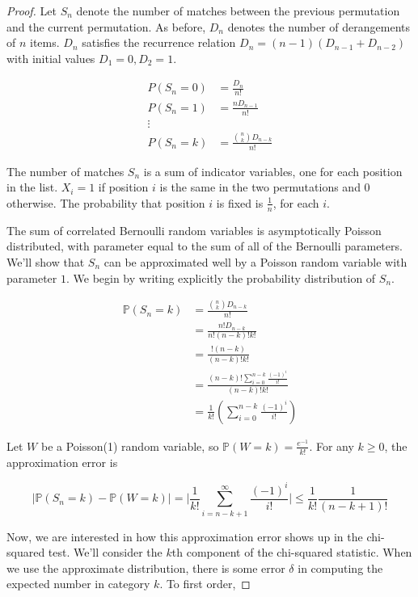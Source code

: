 \documentclass[12pt]{article}
\begin{document}
\begin{proof}


Let $S_n$ denote the number of matches between the previous permutation and the current permutation.
As before, $D_n$ denotes the number of derangements of $n$ items.
$D_n$ satisfies the recurrence relation $D_n = (n-1)\left( D_{n-1} + D_{n-2}\right)$ with initial values $D_1 = 0, D_2 = 1$.

\begin{align*}
P(S_n=0) &= \frac{D_n}{n!} \\ 
P(S_n=1) &= \frac{n D_{n-1}}{n!} \\
\vdots \\
P(S_n = k) &= \frac{{n \choose k} D_{n-k}}{n!} 
\end{align*}

The number of matches $S_n$ is a sum of indicator variables, one for each position in the list. $X_i = 1$ if position $i$ is the same in the two permutations and $0$ otherwise. 
The probability that position $i$ is fixed is $\frac{1}{n}$, for each $i$.

The sum of correlated Bernoulli random variables is asymptotically Poisson distributed, with parameter equal to the sum of all of the Bernoulli parameters. 
We'll show that $S_n$ can be approximated well by a Poisson random variable with parameter $1$.
We begin by writing explicitly the probability distribution of $S_n$.

\begin{align*}
\mathbb{P}(S_n = k) &= \frac{{n \choose k} D_{n-k}}{n!} \\
&= \frac{n! D_{n-k}}{n! (n-k)! k!} \\
&= \frac{!(n-k)}{(n-k)!k!} \\
&= \frac{(n-k)! \sum_{i=0}^{n-k}\frac{(-1)^i}{i!}}{(n-k)!k!} \\
&= \frac{1}{k!} \left( \sum_{i=0}^{n-k} \frac{(-1)^i}{i!} \right)
\end{align*}

Let $W$ be a Poisson(1) random variable, so $\mathbb{P}(W=k) = \frac{e^{-1}}{k!}$.
For any $k\geq0$, the approximation error is 

$$\lvert \mathbb{P}(S_n = k)-\mathbb{P}(W = k)\rvert = \Big\lvert \frac{1}{k!} \sum_{i=n-k+1}^{\infty} \frac{(-1)^i}{i!} \Big\rvert \leq \frac{1}{k!}\frac{1}{(n-k+1)!} $$


Now, we are interested in how this approximation error shows up in the chi-squared test.
We'll consider the $k$th component of the chi-squared statistic.
When we use the approximate distribution, there is some error $\delta$ in computing the expected number in category $k$.
To first order,


\end{proof}
\end{document}
